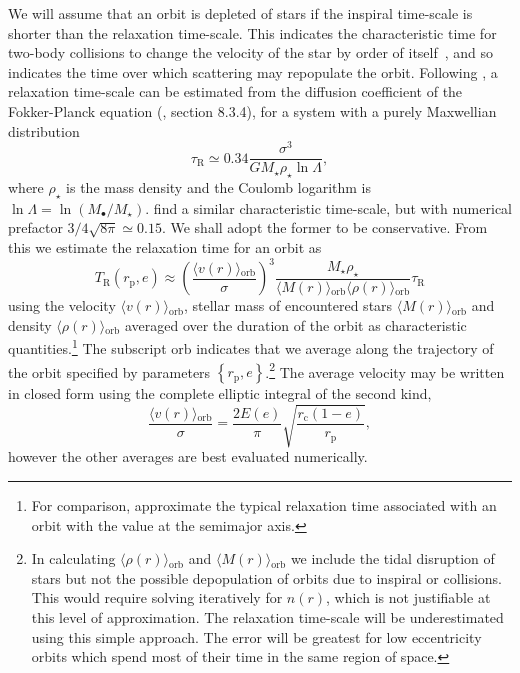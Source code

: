 \documentclass[useAMS,usedcolumn,usegraphicx,usenatbib]{mn2e}
\newcommand{\sub}[1]{\ensuremath{_\mathrm{#1}}}
\begin{document}
We will assume that an orbit is depleted of stars if the inspiral time-scale is shorter than the relaxation time-scale. This indicates the characteristic time for two-body collisions to change the velocity of the star by order of itself~\citep{Binney1987}, and so indicates the time over which scattering may repopulate the orbit. Following \citep{Spitzer1971}, a relaxation time-scale can be estimated from the diffusion coefficient of the Fokker-Planck equation (\citealt{Binney1987}, section 8.3.4), for a system with a purely Maxwellian distribution
\begin{equation}
\tau\sub{R} \simeq 0.34\frac{\sigma^3}{GM_\star\rho_\star\ln\Lambda},
\end{equation}
where $\rho_\star$ is the mass density and the Coulomb logarithm is $\ln\Lambda = \ln(M_\bullet/M_\star)$. \citet{Bahcall1977} find a similar characteristic time-scale, but with numerical prefactor $3/4\sqrt{8\pi} \simeq 0.15$. We shall adopt the former to be conservative. From this we estimate the relaxation time for an orbit as
\begin{equation}
T\sub{R}(r\sub{p},e) \approx \left(\frac{\langle v(r)\rangle\sub{orb}}{\sigma}\right)^3\frac{M_\star\rho_\star}{\langle M(r)\rangle\sub{orb}\langle \rho(r)\rangle\sub{orb}}\tau\sub{R}
\end{equation}
using the velocity $\langle v(r)\rangle\sub{orb}$, stellar mass of encountered stars $\langle M(r)\rangle\sub{orb}$ and density $\langle \rho(r)\rangle\sub{orb}$ averaged over the duration of the orbit as characteristic quantities.\footnote{For comparison, \citet{Hopman2005} approximate the typical relaxation time associated with an orbit with the value at the semimajor axis.} The subscript $\mathrm{orb}$ indicates that we average along the trajectory of the orbit specified by parameters $\left\{r\sub{p},e\right\}$.\footnote{In calculating $\langle \rho(r)\rangle\sub{orb}$ and $\langle M(r)\rangle\sub{orb}$ we include the tidal disruption of stars but not the possible depopulation of orbits due to inspiral or collisions. This would require solving iteratively for $n(r)$, which is not justifiable at this level of approximation. The relaxation time-scale will be underestimated using this simple approach. The error will be greatest for low eccentricity orbits which spend most of their time in the same region of space.} The average velocity may be written in closed form using the complete elliptic integral of the second kind,
\begin{equation}
\frac{\langle v(r)\rangle\sub{orb}}{\sigma} = \frac{2 E(e)}{\pi}\sqrt{\frac{r\sub{c}(1 - e)}{r\sub{p}}},
\end{equation}
however the other averages are best evaluated numerically.
\end{document}
